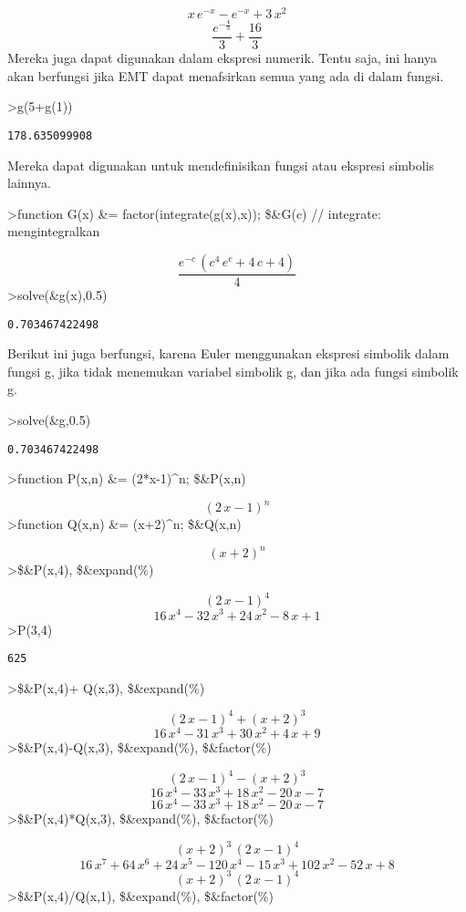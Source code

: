 \documentclass[
]{book}
\begin{document}
\[x\,e^ {- x }-e^ {- x }+3\,x^2\] \[\frac{e^ {- \frac{4}{3} }}{3}+\frac{16}{3}\]Mereka juga dapat digunakan dalam ekspresi numerik. Tentu saja, ini hanya akan berfungsi jika EMT dapat menafsirkan semua yang ada di dalam fungsi.

\textgreater g(5+g(1))

\begin{verbatim}
178.635099908
\end{verbatim}

Mereka dapat digunakan untuk mendefinisikan fungsi atau ekspresi simbolis lainnya.

\textgreater function G(x) \&= factor(integrate(g(x),x)); \$\&G(c) // integrate: mengintegralkan

\[\frac{e^ {- c }\,\left(c^4\,e^{c}+4\,c+4\right)}{4}\]\textgreater solve(\&g(x),0.5)

\begin{verbatim}
0.703467422498
\end{verbatim}

Berikut ini juga berfungsi, karena Euler menggunakan ekspresi simbolik dalam fungsi g, jika tidak menemukan variabel simbolik g, dan jika ada fungsi simbolik g.

\textgreater solve(\&g,0.5)

\begin{verbatim}
0.703467422498
\end{verbatim}

\textgreater function P(x,n) \&= (2*x-1)\^{}n; \$\&P(x,n)

\[\left(2\,x-1\right)^{n}\]\textgreater function Q(x,n) \&= (x+2)\^{}n; \$\&Q(x,n)

\[\left(x+2\right)^{n}\]\textgreater\$\&P(x,4), \$\&expand(\%)

\[\left(2\,x-1\right)^4\] \[16\,x^4-32\,x^3+24\,x^2-8\,x+1\]\textgreater P(3,4)

\begin{verbatim}
625
\end{verbatim}

\textgreater\$\&P(x,4)+ Q(x,3), \$\&expand(\%)

\[\left(2\,x-1\right)^4+\left(x+2\right)^3\] \[16\,x^4-31\,x^3+30\,x^2+4\,x+9\]\textgreater\$\&P(x,4)-Q(x,3), \$\&expand(\%), \$\&factor(\%)

\[\left(2\,x-1\right)^4-\left(x+2\right)^3\] \[16\,x^4-33\,x^3+18\,x^2-20\,x-7\] \[16\,x^4-33\,x^3+18\,x^2-20\,x-7\]\textgreater\$\&P(x,4)*Q(x,3), \$\&expand(\%), \$\&factor(\%)

\[\left(x+2\right)^3\,\left(2\,x-1\right)^4\] \[16\,x^7+64\,x^6+24\,x^5-120\,x^4-15\,x^3+102\,x^2-52\,x+8\] \[\left(x+2\right)^3\,\left(2\,x-1\right)^4\]\textgreater\$\&P(x,4)/Q(x,1), \$\&expand(\%), \$\&factor(\%)
\end{document}
